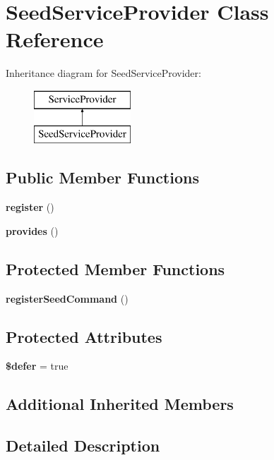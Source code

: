 \section{Seed\+Service\+Provider Class Reference}
\label{class_illuminate_1_1_database_1_1_seed_service_provider}
Inheritance diagram for Seed\+Service\+Provider\+:\begin{figure}[H]
\begin{center}
\leavevmode
\includegraphics[height=2.000000cm]{class_illuminate_1_1_database_1_1_seed_service_provider}
\end{center}
\end{figure}
\subsection*{Public Member Functions}
\begin{DoxyCompactItemize}
\item 
{\bf register} ()
\item 
{\bf provides} ()
\end{DoxyCompactItemize}
\subsection*{Protected Member Functions}
\begin{DoxyCompactItemize}
\item 
{\bf register\+Seed\+Command} ()
\end{DoxyCompactItemize}
\subsection*{Protected Attributes}
\begin{DoxyCompactItemize}
\item 
{\bf \$defer} = true
\end{DoxyCompactItemize}
\subsection*{Additional Inherited Members}


\subsection{Detailed Description}


